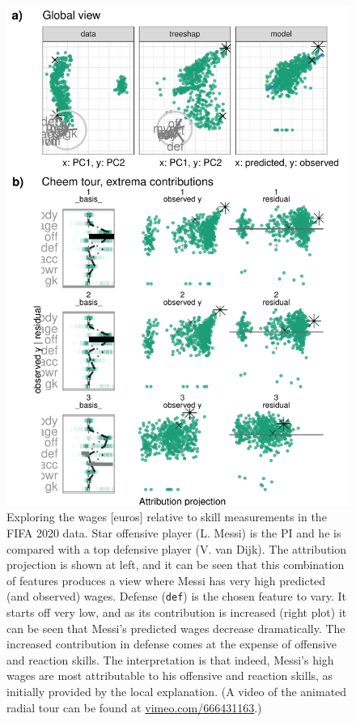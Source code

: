 \documentclass[
]{article}
\begin{document}
\begin{figure}

{\centering \includegraphics[width=1\linewidth]{./figures/case_fifa} 

}

\caption{Exploring the wages {[}euros{]} relative to skill measurements in the FIFA 2020 data. Star offensive player (L. Messi) is the PI and he is compared with a top defensive player (V. van Dijk). The attribution projection is shown at left, and it can be seen that this combination of features produces a view where Messi has very high predicted (and observed) wages. Defense (\texttt{def}) is the chosen feature to vary. It starts off very low, and as its contribution is increased (right plot) it can be seen that Messi's predicted wages decrease dramatically. The increased contribution in defense comes at the expense of offensive and reaction skills. The interpretation is that indeed, Messi's high wages are most attributable to his offensive and reaction skills, as initially provided by the local explanation. (A video of the animated radial tour can be found at \href{https://vimeo.com/666431163}{vimeo.com/666431163}.)}\label{fig:casefifa}
\end{figure}
\end{document}
